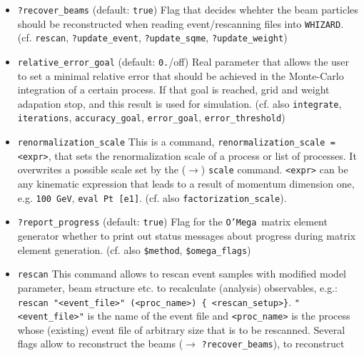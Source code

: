 \documentclass[12pt]{book}
\newcommand{\ttt}[1]{\texttt{#1}}
\newcommand{\whizard}{\texttt{WHIZARD}}
\newcommand{\oMega}{\texttt{O'Mega}}
\begin{document}
\begin{itemize}
{(eval Rap [e1])} defines a record with name \ttt{rap1} which has an
evaluator to calculate the rapidity (predefined \whizard\ function) of
an outgoing electron.
(cf. also \ttt{eval}, \ttt{histogram}, \ttt{plot})
\item
\ttt{?recover\_beams} \qquad (default: \ttt{true}) \newline
Flag that decides whehter the beam particles should be reconstructed
when reading event/rescanning files into \whizard. (cf. \ttt{rescan},
\ttt{?update\_event}, \ttt{?update\_sqme}, \newline 
\ttt{?update\_weight})
\item
\ttt{relative\_error\_goal} \qquad (default: \ttt{0.}/off) \newline
Real parameter that allows the user to set a minimal relative error
that should be achieved in the Monte-Carlo integration of a certain 
process. If that goal is reached, grid and weight adapation stop, and
this result is used for simulation. (cf. also \ttt{integrate},
\ttt{iterations}, \ttt{accuracy\_goal}, \ttt{error\_goal},
\ttt{error\_threshold}) 
\item
\ttt{renormalization\_scale} \newline
This is a command, \ttt{renormalization\_scale = <expr>}, that sets
the renormalization scale of a process or list of processes. It
overwrites a possible scale set by the ($\to$) \ttt{scale} command. 
\ttt{<expr>} can be any kinematic expression that leads to a result of
momentum dimension one, e.g. \ttt{100 GeV}, \ttt{eval
Pt [e1]}. (cf. also \ttt{factorization\_scale}). 
\item
\ttt{?report\_progress} \qquad (default: \ttt{true}) \newline
Flag for the \oMega\ matrix element generator whether to print out
status messages about progress during matrix element
generation. (cf. also \ttt{\$method}, \ttt{\$omega\_flags})
\item
\ttt{rescan} \newline
This command allows to rescan event samples with modified model
parameter, beam structure etc. to recalculate (analysis) observables,
e.g.: \newline 
\ttt{rescan "<event\_file>" (<proc\_name>) \{ <rescan\_setup>\}}. 
\newline 
\ttt{"<event\_file>"} is the name of the event file and
\ttt{<proc\_name>} is the process whose (existing) event 
file of arbitrary size that is to be rescanned. Several flags allow to
reconstruct the beams ($\to$ \ttt{?recover\_beams}), to reconstruct

\end{itemize}
\end{document}
